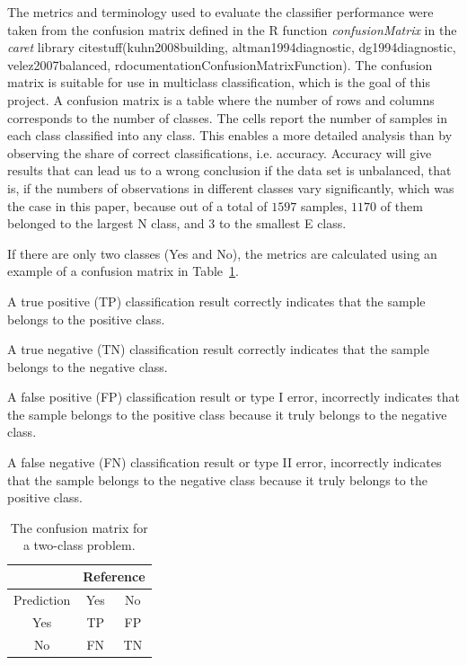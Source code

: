 \documentclass[preprint,12pt]{elsarticle}
\begin{document}
The metrics and terminology used to evaluate the classifier performance were taken from the confusion matrix defined in the R function \textit{confusionMatrix} in the \textit{caret} library citestuff(kuhn2008building, altman1994diagnostic, dg1994diagnostic, velez2007balanced, rdocumentationConfusionMatrixFunction). The confusion matrix is suitable for use in multiclass classification, which is the goal of this project. A confusion matrix is a table where the number of rows and columns corresponds to the number of classes. The cells report the number of samples in each class classified into any class. This enables a more detailed analysis than by observing the share of correct classifications, i.e. accuracy. Accuracy will give results that can lead us to a wrong conclusion if the data set is unbalanced, that is, if the numbers of observations in different classes vary significantly, which was the case in this paper, because out of a total of $1597$ samples, $1170$ of them belonged to the largest N class, and $3$ to the smallest E class.

If there are only two classes (Yes and No), the metrics are calculated using an example of a confusion matrix in Table~\ref{tab:cm}.

A true positive (TP) classification result correctly indicates that the sample belongs to the positive class.

A true negative (TN) classification result correctly indicates that the sample belongs to the negative class.
 
A false positive (FP) classification result or type I error, incorrectly indicates that the sample belongs to the positive class because it truly belongs to the negative class.

A false negative (FN) classification result or type II error, incorrectly indicates that the sample belongs to the negative class because it truly belongs to the positive class.

\begin{table}[!ht]
	\centering
	\begin{tabular}{|c|c|c|}
		\hline
		 & \multicolumn{2}{|c|}{Reference} \\ \hline
        Prediction & Yes & No \\ \hline
        Yes & TP & FP \\ \hline
        No & FN & TN \\ \hline
	\end{tabular}
	\caption{The confusion matrix for a two-class problem.}
	\label{tab:cm}
\end{table}
\end{document}
